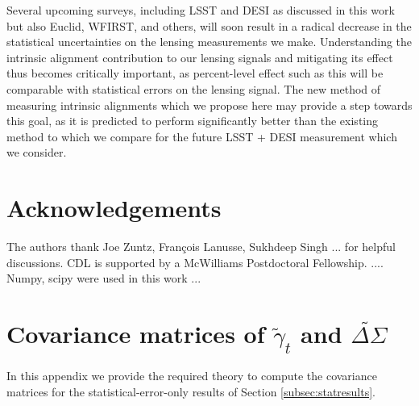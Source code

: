 \documentclass[a4paper,fleqn,usenatbib]{mnras}
\begin{document}
Several upcoming surveys, including LSST and DESI as discussed in this work but also Euclid, WFIRST, and others, will soon result in a radical decrease in the statistical uncertainties on the lensing measurements we make. Understanding the intrinsic alignment contribution to our lensing signals and mitigating its effect thus becomes critically important, as percent-level effect such as this will be comparable with statistical errors on the lensing signal. The new method of measuring intrinsic alignments which we propose here may provide a step towards this goal, as it is predicted to perform significantly better than the existing method to which we compare for the future LSST + DESI measurement which we consider.

\section*{Acknowledgements}
The authors thank Joe Zuntz, Fran\c{c}ois Lanusse, Sukhdeep Singh ... for helpful discussions. CDL is supported by a McWilliams Postdoctoral Fellowship. ....
Numpy, scipy were used in this work ...









\appendix

\section{Covariance matrices of $\tilde{\gamma}_t$ and $\widetilde{\Delta \Sigma}$}
\label{app:cov}
In this appendix we provide the required theory to compute the covariance matrices for the statistical-error-only results of Section \ref{subsec:statresults}.
\end{document}
